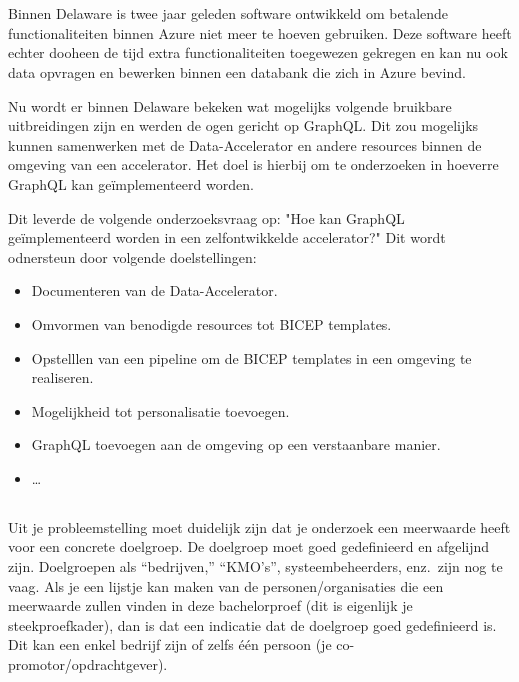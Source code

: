 
\chapter{}%
\label{ch:inleiding}

Binnen Delaware is twee jaar geleden software ontwikkeld om betalende functionaliteiten binnen Azure niet meer te hoeven gebruiken. Deze software heeft echter dooheen de tijd extra functionaliteiten toegewezen gekregen en kan nu ook data opvragen en bewerken binnen een databank die zich in Azure bevind.

Nu wordt er binnen Delaware bekeken wat mogelijks volgende bruikbare uitbreidingen zijn en werden de ogen gericht op GraphQL. Dit zou mogelijks kunnen samenwerken met de Data-Accelerator en andere resources binnen de omgeving van een accelerator. Het doel is hierbij om te onderzoeken in hoeverre GraphQL kan geïmplementeerd worden.

Dit leverde de volgende onderzoeksvraag op: "Hoe kan GraphQL geïmplementeerd worden in een zelfontwikkelde accelerator?" Dit wordt odnersteun door volgende doelstellingen:

\begin{itemize}
  \item Documenteren van de Data-Accelerator.
  \item Omvormen van benodigde resources tot BICEP templates.
  \item Opstelllen van een pipeline om de BICEP templates in een omgeving te realiseren.
  \item Mogelijkheid tot personalisatie toevoegen.
  \item GraphQL toevoegen aan de omgeving op een verstaanbare manier.
  \item \ldots
\end{itemize}

\section{}%
\label{sec:probleemstelling}

Uit je probleemstelling moet duidelijk zijn dat je onderzoek een meerwaarde heeft voor een concrete doelgroep. De doelgroep moet goed gedefinieerd en afgelijnd zijn. Doelgroepen als ``bedrijven,'' ``KMO's'', systeembeheerders, enz.~zijn nog te vaag. Als je een lijstje kan maken van de personen/organisaties die een meerwaarde zullen vinden in deze bachelorproef (dit is eigenlijk je steekproefkader), dan is dat een indicatie dat de doelgroep goed gedefinieerd is. Dit kan een enkel bedrijf zijn of zelfs één persoon (je co-promotor/opdrachtgever).

